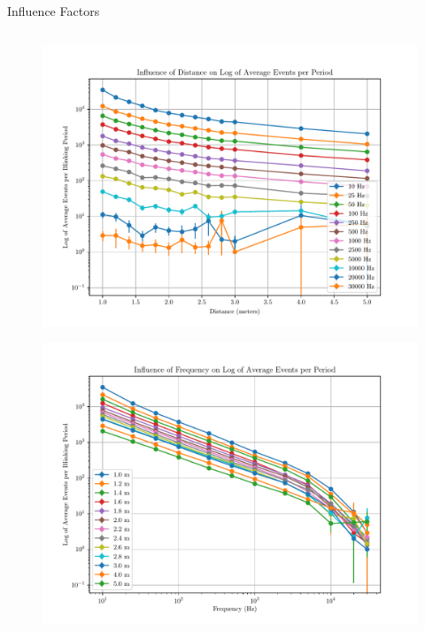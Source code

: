 \documentclass{beamer}
\begin{document}

\begin{frame}{Influence Factors}

\begin{columns}[T]
    \begin{column}{0.48\textwidth}
        \vspace{-0.5cm}
        \begin{figure}[H]
            \centering
            \includegraphics[width=\textwidth]{../fig/semestral/distlog.pdf}
            \label{fig:dist_influence}
        \end{figure}
        
        \vspace{-1.5cm}
        
        \begin{figure}[H]
            \centering
            \includegraphics[width=\textwidth]{../fig/semestral/freqlog.pdf}
            \label{fig:freq_influence}
        \end{figure}
    \end{column}
    

\end{columns}
\end{frame}
\end{document}
